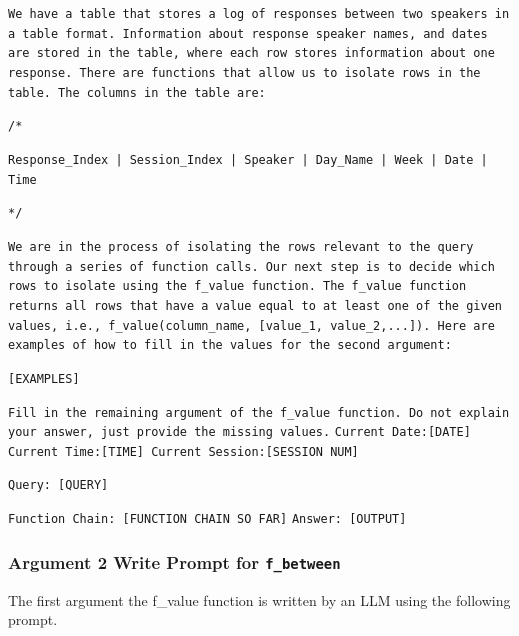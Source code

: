 \documentclass{article}
\begin{document}
\colorbox{prompt_gray}{\begin{minipage}{.98\textwidth}
\texttt{We have a table that stores a log of responses between two speakers in a table format. Information about response speaker names, and dates are stored in the table, where each row stores information about one response. There are functions that allow us to isolate rows in the table. The columns in the table are:}
\newline

\texttt{/*}

\texttt{Response\_Index | Session\_Index | Speaker | Day\_Name | Week | Date | Time}

\texttt{*/}
\newline

\texttt{We are in the process of isolating the rows relevant to the query through a series of function calls. Our next step is to decide which rows to isolate using the f\_value function. The f\_value function returns all rows that have a value equal to at least one of the given values, i.e., f\_value(column\_name, [value\_1, value\_2,...]). Here are examples of how to fill in the values for the second argument:}
\newline

\texttt{[EXAMPLES]}
\newline


\texttt{Fill in the remaining argument of the f\_value function. Do not explain your answer, just provide the missing values.}
\newline
\texttt{Current Date:[DATE] Current Time:[TIME] Current Session:[SESSION NUM]}

\texttt{Query: [QUERY]}

\texttt{Function Chain: [FUNCTION CHAIN SO FAR]}
\texttt{Answer: [OUTPUT]}
\end{minipage}}
\newpage






\subsubsection{Argument 2 Write Prompt for \texttt{f\_between}}
The first argument the f\_value function is written by an LLM using the following prompt.
\end{document}
